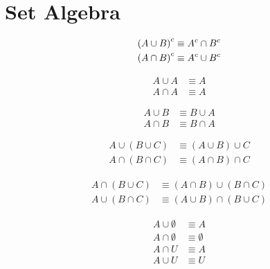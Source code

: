 \section{Set Algebra}
\begin{definition}
\begin{align}
    {(A \cup B)}^{c} &\equiv {A}^{c} \cap {B}^{c} \\
    {(A \cap B)}^{c} &\equiv {A}^{c} \cup {B}^{c}
\end{align}
\end{definition}

\begin{definition}
\begin{align}
    A \cup A &\equiv A \\
    A \cap A &\equiv A
\end{align}
\end{definition}

\begin{definition}
\begin{align}
    A \cup B &\equiv B \cup A \\
    A \cap B &\equiv B \cap A
\end{align}
\end{definition}

\begin{definition}
\begin{align}
    A \cup (B \cup C) &\equiv (A \cup B) \cup C \\
    A \cap (B \cap C) &\equiv (A \cap B) \cap C
\end{align}
\end{definition}

\begin{definition}
\begin{align}
    A \cap (B \cup C) &\equiv (A \cap B) \cup (B \cap C)\\
    A \cup (B \cap C) &\equiv (A \cup B) \cap (B \cup C)
\end{align}
\end{definition}

\begin{definition}
\begin{align}
    A \cup \emptyset &\equiv A \\
    A \cap \emptyset &\equiv \emptyset \\
    A \cap U &\equiv A \\
    A \cup U &\equiv U
\end{align}
\end{definition}

